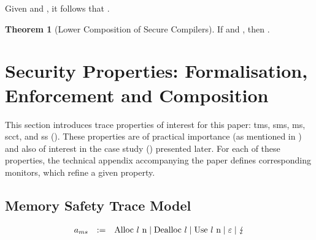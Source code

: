 \documentclass[dvipsnames,conference]{IEEEtran}
\theoremstyle{definition}
\newtheorem{theorem}{Theorem}[section]
\begin{document}
Given  and , it follows that .

\begin{theorem}[Lower Composition of Secure Compilers]\label{thm:lrtp}
  If  and , then . %
\end{theorem}


\section{Security Properties: Formalisation, Enforcement and Composition}\label{sec:compprop}

This section introduces trace properties of interest for this paper: \gls*{tms}, \gls*{sms}, \gls*{ms}, \gls*{scct}, and \gls*{ss} ().
These properties are of practical importance (as mentioned in ) and also of interest in the case study () presented later. 
For each of these properties, the technical appendix accompanying the paper defines corresponding monitors, which refine a given property. 

\subsection{Memory Safety Trace Model}\label{subsec:propdefs}\label{subsec:basic:memsafety:tracemodel}

\vspace{-1.5em}

\[
  \begin{array}{rcll}
    \event[_{ms}] &:=& \ev{Alloc \loc\ n} \mid \ev{Dealloc \loc} \mid \ev{Use \loc\ n} \mid \emptyevent \mid \lightning \\ 
  \end{array}
\]
\end{document}
